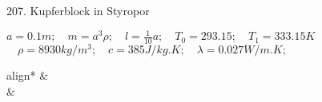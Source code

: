 \documentclass{alex_hü}
\begin{document}
\renewcommand{\labelenumi}{\alph{enumi}\hskip0pt)}

\begin{mybox}{207. Kupferblock in Styropor}
	\begin{center} \( a = 0.1 \unit{m};\quad m = a^3\rho;\quad l = \tfrac{1}{10}a;\quad T_0 = 293.15;\quad T_1 = 333.15 \unit{K} \)\\
	\( \quad \rho = 8930 \unit{kg/m^3};\quad c = 385 \unit{J/kg.K};\quad \lambda = 0.027 \unit{W/m.K};\quad \)\end{center}
	\begin{empheq}[box=\fbox]{align*}
		&\\
		&
	\end{empheq}
	

\end{mybox}
\end{document}
